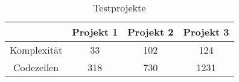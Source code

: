 \bgroup
\def\arraystretch{2}
\begin{table}[!h]
	\vspace{.5cm}
	\begin{center}
		\begin{tabular}{|c||c|c|c|}
			\hline 
			& Projekt 1 & Projekt 2 & Projekt 3 \\
			\hline 
			\hline
			Komplexität & 33 & 102 & 124 \\
			\hline
			Codezeilen & 318 & 730 & 1231 \\
			\hline
		\end{tabular} 
	\end{center}
	\caption{Testprojekte}
	\label{fig:project}
\end{table}
\egroup